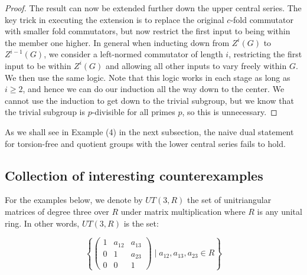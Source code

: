 \documentclass{ucetd}
\begin{document}
\begin{proof}
  The result can now be extended further down the upper central
  series. The key trick in executing the extension is to replace the
  original $c$-fold commutator with smaller fold commutators, but now
  restrict the first input to being within the member one higher. In
  general when inducting down from $Z^i(G)$ to $Z^{i-1}(G)$, we
  consider a left-normed commutator of length $i$, restricting the
  first input to be within $Z^i(G)$ and allowing all other inputs to
  vary freely within $G$. We then use the same logic. Note that this
  logic works in each stage as long as $i \ge 2$, and hence we can do
  our induction all the way down to the center. We cannot use the
  induction to get down to the trivial subgroup, but we know that the
  trivial subgroup is $p$-divisible for all primes $p$, so this is
  unnecessary.
\end{proof}

As we shall see in Example (4) in the next subsection, the naive dual
statement for torsion-free and quotient groups with the lower central
series fails to hold.

\subsection{Collection of interesting counterexamples}\label{sec:group-ctex}

For the examples below, we denote by $UT(3,R)$ the set of
unitriangular matrices of degree three over $R$ under matrix
multiplication where $R$ is any unital ring. In other words, $UT(3,R)$
is the set:

$$\left \{\begin{pmatrix}
1 & a_{12} & a_{13} \\
0 & 1 & a_{23}\\
0 & 0 & 1\end{pmatrix} \mid a_{12},a_{13},a_{23} \in R \right \}$$
\end{document}
